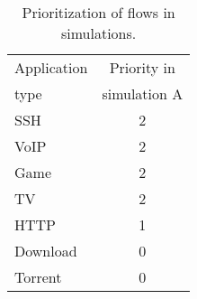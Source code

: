 \begin{table}
	\caption{Prioritization of flows in simulations.}
	\label{tab:flows_prio}
	\centering
	
	\begin{tabular}{@{}lc@{}}
		\toprule
        Application     & Priority in     \\ 
        type            & simulation A    \\ \midrule
        SSH             & 2               \\
        VoIP            & 2               \\
        Game            & 2               \\
        TV              & 2               \\
        HTTP            & 1               \\
        Download        & 0               \\
        Torrent         & 0               \\ \bottomrule
	\end{tabular}
\end{table}
